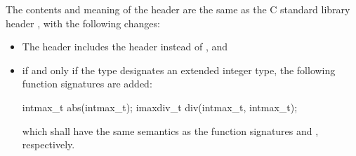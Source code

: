 \pnum
The contents and meaning of the header 
are the same as the C standard library header ,
with the following changes:
\begin{itemize}
\item
The header  includes the header  instead
of , and
\item
if and only if the type  designates an extended integer
type, the following function signatures are added:
\begin{codeblock}
intmax_t abs(intmax_t);
imaxdiv_t div(intmax_t, intmax_t);
\end{codeblock}
which shall have the same semantics as the function signatures
 and
, respectively.
\end{itemize}

